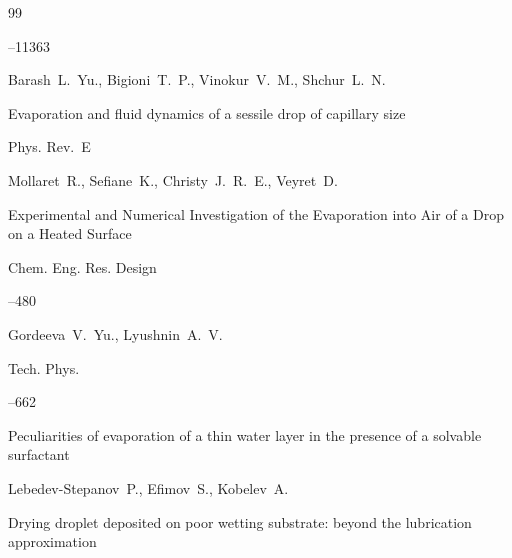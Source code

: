 \begin{thebibliography}{99}

--11363





\by Barash~L.~Yu., Bigioni~T.~P., Vinokur~V.~M., Shchur~L.~N.

\paper  Evaporation and fluid dynamics of a sessile drop of capillary size

\jour Phys. Rev.~E









\by Mollaret~R., Sefiane~K., Christy~J.~R.~E., Veyret~D.

\paper  Experimental and Numerical Investigation of the Evaporation into Air of a Drop on a Heated Surface

\jour Chem. Eng. Res. Design 




--480





\by Gordeeva~V.~Yu., Lyushnin~A.~V.

\jour Tech. Phys. 





–662 

\paper Peculiarities of evaporation of a thin water layer in the presence of a solvable surfactant






\by  Lebedev-Stepanov~P., Efimov~S., Kobelev~A. 

\paper Drying droplet deposited on poor wetting substrate: beyond the lubrication approximation


\end{thebibliography}
